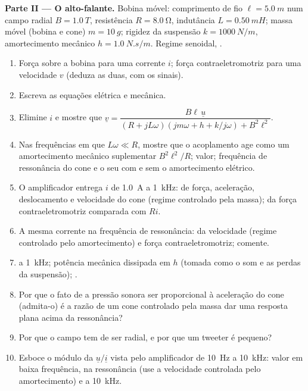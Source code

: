 \begin{problem}
\medskip
\noindent\textbf{Parte II --- O alto-falante.}
Bobina móvel: comprimento de fio $\ell = \qty{5.0}{m}$ num campo radial $B =
\qty{1.0}{T}$, resistência $R = \qty{8.0}{\ohm}$, indutância $L = \qty{0.50}{mH}$;
massa móvel (bobina e cone) $m = \qty{10}{g}$; rigidez da suspensão
$k = \qty{1000}{N/m}$, amortecimento mecânico $h = \qty{1.0}{N.s/m}$. Regime
senoidal, .
\begin{enumerate}[resume]
  \item Força sobre a bobina para uma corrente $i$; força contraeletromotriz para uma velocidade $v$
        (deduza as duas, com os sinais).
  \item Escreva as equações elétrica e mecânica.
  \item Elimine $i$ e mostre que
        $\underline v = \dfrac{B\ell\,\underline u}{(R + jL\omega)(jm\omega + h + k/j\omega) + B^2\ell^2}$.
  \item Nas frequências em que $L\omega \ll R$, mostre que o acoplamento age
        como um amortecimento mecânico suplementar $B^2\ell^2/R$; valor; frequência de
        ressonância do cone e o seu  com e sem
        o amortecimento elétrico.
  \item O amplificador entrega $i$ de  \qty{1.0}{A} a \qty{1}{kHz}:
         de força, aceleração, deslocamento e velocidade do
        cone (regime controlado pela massa);  da força contraeletromotriz comparada com
        $Ri$.
  \item A mesma corrente na frequência de ressonância:  da velocidade
        (regime controlado pelo amortecimento) e força contraeletromotriz; comente.
  \item {} a \qty{1}{kHz}; potência mecânica dissipada em
        $h$ (tomada como o som e as perdas da suspensão); .
  \item Por que o fato de a pressão sonora ser proporcional à aceleração
        do cone (admita-o) é a razão de um cone controlado pela massa dar uma
        resposta plana acima da ressonância?
  \item Por que o campo tem de ser radial, e por que um tweeter é pequeno?
  \item Esboce o módulo da  $\underline u/\underline i$ vista
        pelo amplificador de \qty{10}{Hz} a \qty{10}{kHz}: valor em baixa
        frequência, na ressonância (use a velocidade controlada pelo amortecimento)
        e a \qty{10}{kHz}.
\end{enumerate}


\end{problem}
